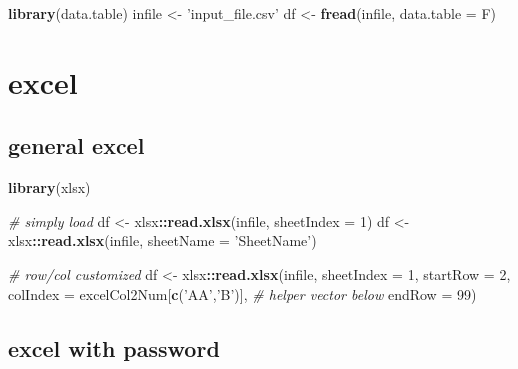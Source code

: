 \documentclass[
]{book}
\newenvironment{Shaded}{\begin{snugshade}}{\end{snugshade}}
\newcommand{\CommentTok}[1]{\textcolor[rgb]{0.56,0.35,0.01}{\textit{#1}}}
\newcommand{\DataTypeTok}[1]{\textcolor[rgb]{0.13,0.29,0.53}{#1}}
\newcommand{\DecValTok}[1]{\textcolor[rgb]{0.00,0.00,0.81}{#1}}
\newcommand{\KeywordTok}[1]{\textcolor[rgb]{0.13,0.29,0.53}{\textbf{#1}}}
\newcommand{\NormalTok}[1]{#1}
\newcommand{\OperatorTok}[1]{\textcolor[rgb]{0.81,0.36,0.00}{\textbf{#1}}}
\newcommand{\StringTok}[1]{\textcolor[rgb]{0.31,0.60,0.02}{#1}}
\begin{document}
\begin{Shaded}
\begin{Highlighting}[]
\KeywordTok{library}\NormalTok{(data.table)}
\NormalTok{infile <-}\StringTok{ 'input_file.csv'}
\NormalTok{df <-}\StringTok{ }\KeywordTok{fread}\NormalTok{(infile, }\DataTypeTok{data.table =}\NormalTok{ F)}
\end{Highlighting}
\end{Shaded}

\hypertarget{excel}{%
\section{excel}\label{excel}}

\hypertarget{general-excel}{%
\subsection{general excel}\label{general-excel}}

\begin{Shaded}
\begin{Highlighting}[]
\KeywordTok{library}\NormalTok{(xlsx)}

\CommentTok{# simply load}
\NormalTok{df <-}\StringTok{ }\NormalTok{xlsx}\OperatorTok{::}\KeywordTok{read.xlsx}\NormalTok{(infile, }\DataTypeTok{sheetIndex =} \DecValTok{1}\NormalTok{)}
\NormalTok{df <-}\StringTok{ }\NormalTok{xlsx}\OperatorTok{::}\KeywordTok{read.xlsx}\NormalTok{(infile, }\DataTypeTok{sheetName =} \StringTok{'SheetName'}\NormalTok{)}

\CommentTok{# row/col customized}
\NormalTok{df <-}\StringTok{ }\NormalTok{xlsx}\OperatorTok{::}\KeywordTok{read.xlsx}\NormalTok{(infile,}
                      \DataTypeTok{sheetIndex =} \DecValTok{1}\NormalTok{,}
                      \DataTypeTok{startRow =} \DecValTok{2}\NormalTok{,}
                      \DataTypeTok{colIndex =}\NormalTok{ excelCol2Num[}\KeywordTok{c}\NormalTok{(}\StringTok{'AA'}\NormalTok{,}\StringTok{'B'}\NormalTok{)], }\CommentTok{# helper vector below}
                      \DataTypeTok{endRow =} \DecValTok{99}\NormalTok{)}
\end{Highlighting}
\end{Shaded}

\hypertarget{excel-with-password}{%
\subsection{excel with password}\label{excel-with-password}}
\end{document}
